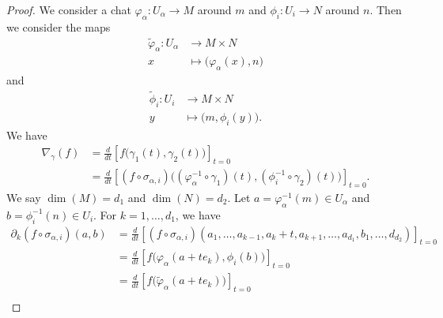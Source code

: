 \begin{proof}
	We consider a chat \(\varphi_{\alpha} \colon U_{\alpha}\to M  \) around \( m\) and \(\phi_i \colon U_i\to N  \) around \( n\). Then we consider the maps
	\begin{equation}
		\begin{aligned}
			\tilde \varphi_{\alpha}\colon U_{\alpha} & \to M\times N                              \\
			x                                        & \mapsto \big( \varphi_{\alpha}(x), n \big)
		\end{aligned}
	\end{equation}
	and
	\begin{equation}
		\begin{aligned}
			\tilde \phi_i\colon U_i & \to M\times N                    \\
			y                       & \mapsto \big( m,\phi_i(y) \big).
		\end{aligned}
	\end{equation}
	We have
	\begin{subequations}		\label{SUBEQSooXRISooUJIdlF}
		\begin{align}
			\nabla_{\gamma}(f) & =\frac{d}{dt} \left[ f\Big( \gamma_1(t),\gamma_2(t) \Big)  \right]_{t=0}                                                                        \\
			                   & =\frac{d}{dt} \left[ (f\circ\sigma_{\alpha,i})\Big( (\varphi_{\alpha}^{-1}\circ\gamma_1)(t),(\phi_i^{-1}\circ\gamma_2)(t) \Big)  \right]_{t=0}.
		\end{align}
	\end{subequations}
	We say \( \dim(M)=d_1\) and \( \dim(N)=d_2\). Let \( a=\varphi_{\alpha}^{-1}(m)\in U_{\alpha}\) and \( b=\phi_i^{-1}(n)\in U_i\). For \( k=1,\ldots,d_1\), we have
	\begin{subequations}
		\begin{align}
			\partial_k(f\circ\sigma_{\alpha,i})(a,b) & =\frac{d}{dt} \left[ (f\circ\sigma_{\alpha,i})(a_1,\ldots,a_{k-1},a_k+t,a_{k+1},\ldots,a_{d_1}, b_1,\ldots,d_{d_2})  \right]_{t=0} \\
			                                         & =\frac{d}{dt} \left[ f\big( \varphi_{\alpha}(a+te_k),\phi_i(b) \big)  \right]_{t=0}                                                \\
			                                         & =\frac{d}{dt} \left[ f\big( \tilde \varphi_{\alpha}(a+te_k) \big)  \right]_{t=0}                                                   \\

\end{align}
\end{subequations}
\end{proof}
